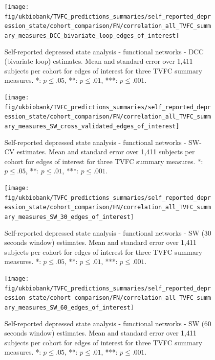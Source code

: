 \begin{figure}[h]
    \centering
    \texttt{[image: fig/ukbiobank/TVFC\_predictions\_summaries/self\_reported\_depression\_state/cohort\_comparison/FN/correlation\_all\_TVFC\_summary\_measures\_DCC\_bivariate\_loop\_edges\_of\_interest]}
    \caption{
        Self-reported depressed state analysis - functional networks - DCC (bivariate loop) estimates.
        Mean and standard error over 1,411 subjects per cohort for edges of interest for three TVFC summary measures.
        *: $p \leq .05$, **: $p \leq .01$, ***: $p \leq .001$.
    }\label{fig:ukb-results-srds-fn-cohort-comparison-edges-of-interest-dcc-bl}
\end{figure}


\begin{figure}[h]
    \centering
    \texttt{[image: fig/ukbiobank/TVFC\_predictions\_summaries/self\_reported\_depression\_state/cohort\_comparison/FN/correlation\_all\_TVFC\_summary\_measures\_SW\_cross\_validated\_edges\_of\_interest]}
    \caption{
        Self-reported depressed state analysis - functional networks - SW-CV estimates.
        Mean and standard error over 1,411 subjects per cohort for edges of interest for three TVFC summary measures.
        *: $p \leq .05$, **: $p \leq .01$, ***: $p \leq .001$.
    }\label{fig:ukb-results-srds-fn-cohort-comparison-edges-of-interest-sw-cv}
\end{figure}


\begin{figure}[h]
    \centering
    \texttt{[image: fig/ukbiobank/TVFC\_predictions\_summaries/self\_reported\_depression\_state/cohort\_comparison/FN/correlation\_all\_TVFC\_summary\_measures\_SW\_30\_edges\_of\_interest]}
    \caption{
        Self-reported depressed state analysis - functional networks - SW (30 seconds window) estimates.
        Mean and standard error over 1,411 subjects per cohort for edges of interest for three TVFC summary measures.
        *: $p \leq .05$, **: $p \leq .01$, ***: $p \leq .001$.
    }\label{fig:ukb-results-srds-fn-cohort-comparison-edges-of-interest-sw-30}
\end{figure}


\begin{figure}[h]
  \centering
  \texttt{[image: fig/ukbiobank/TVFC\_predictions\_summaries/self\_reported\_depression\_state/cohort\_comparison/FN/correlation\_all\_TVFC\_summary\_measures\_SW\_60\_edges\_of\_interest]}
  \caption{
    Self-reported depressed state analysis - functional networks - SW (60 seconds window) estimates.
    Mean and standard error over 1,411 subjects per cohort for edges of interest for three TVFC summary measures.
    *: $p \leq .05$, **: $p \leq .01$, ***: $p \leq .001$.
  }\label{fig:ukb-results-srds-fn-cohort-comparison-edges-of-interest-sw-60}
\end{figure}



